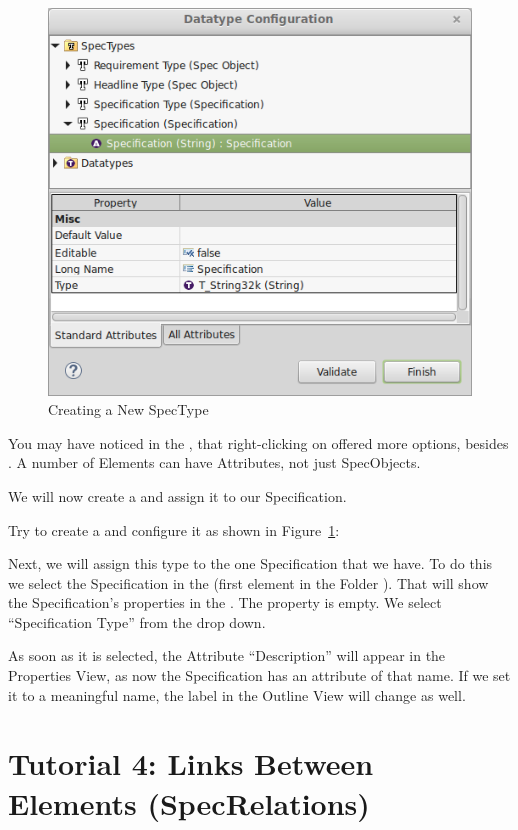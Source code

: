 \begin{figure}
\centering      
\includegraphics[width=0.8\linewidth]{../rmf-images/new_spectype.png}      
\caption{Creating a New SpecType}      
\label{fig:newSpecType}
\end{figure}

You may have noticed in the , that right-clicking on  offered more options, besides .  A number of Elements can have Attributes, not just SpecObjects.

We will now create a  and assign it to our Specification.

Try to create a  and configure it as shown in Figure~\ref{fig:newSpecType}:

Next, we will assign this type to the one Specification that we have.  To do this we select the Specification in the  (first element in the Folder ).  That will show
the Specification's properties in the .  The  property is empty.  We select ``Specification Type'' from the drop down.

As soon as it is selected, the Attribute ``Description'' will appear in the Properties View, as now the Specification has an attribute of that name.  If we set it to a meaningful name, the label in the Outline View will change as well.

\section{Tutorial 4: Links Between Elements (SpecRelations)}

